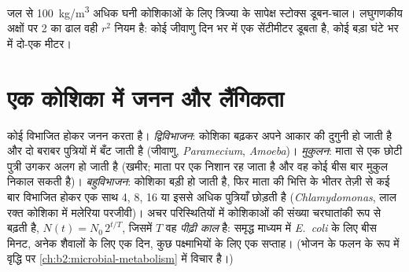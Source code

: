 \begin{omfigure}

{\small जल से \qty{100}{kg/m^3} अधिक घनी कोशिकाओं के लिए त्रिज्या के
सापेक्ष स्टोक्स डूबन-चाल। लघुगणकीय अक्षों पर 2 का ढाल वही $r^2$ नियम है:
कोई जीवाणु दिन भर में एक सेंटीमीटर डूबता है, कोई बड़ा  घंटे भर
में दो-एक मीटर।}
\end{omfigure}

\section{एक कोशिका में जनन और लैंगिकता}

\begin{definition}[विभाजन के ढंग]\label{def:b2:unicellular-diversity:division}
कोई  विभाजित होकर जनन करता है। \emph{द्विविभाजन}: कोशिका
बढ़कर अपने आकार की दुगुनी हो जाती है और दो बराबर पुत्रियों में बँट जाती
है (जीवाणु, \emph{Paramecium}, \emph{Amoeba})।
\emph{मुकुलन}: माता से एक छोटी पुत्री उगकर अलग हो जाती है (खमीर; माता पर
एक निशान रह जाता है और वह कोई बीस बार मुकुल निकाल सकती है)।
\emph{बहुविभाजन}: कोशिका बड़ी हो जाती है, फिर माता की भित्ति के भीतर तेज़ी
से कई बार विभाजित होकर एक साथ 4, 8, 16 या इससे अधिक पुत्रियाँ छोड़ती है
(\emph{Chlamydomonas}, लाल रक्त कोशिका में मलेरिया परजीवी)। अचर
परिस्थितियों में कोशिकाओं की संख्या चरघातांकी रूप से बढ़ती है,
$N(t) = N_0\,2^{t/T}$, जिसमें $T$ वह
\emph{पीढ़ी काल} है: समृद्ध माध्यम में \emph{E.~coli}
के लिए बीस मिनट, अनेक शैवालों के लिए एक दिन, कुछ पक्ष्माभियों के लिए एक
सप्ताह। (भोजन के फलन के रूप में वृद्धि पर
\cref{ch:b2:microbial-metabolism} में विचार है।)
\end{definition}

